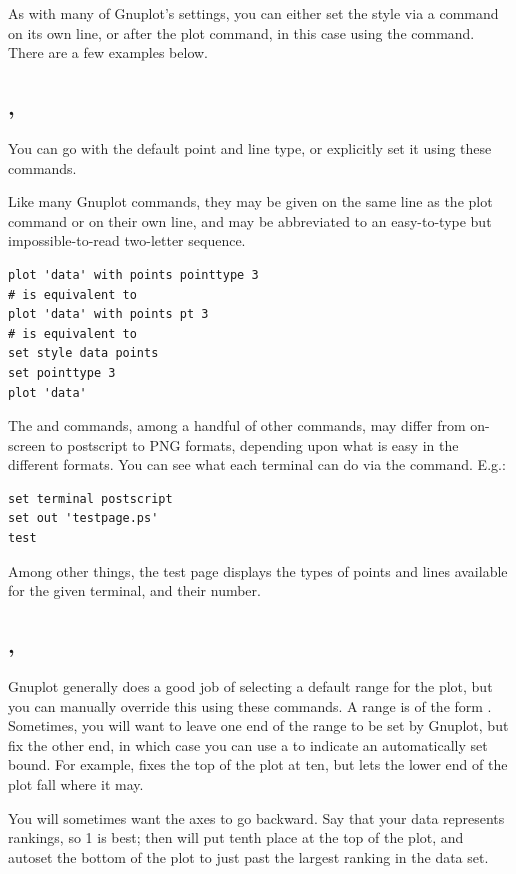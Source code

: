 As with many of Gnuplot's settings, you can either set the style via a
command on its own line, or after the plot command, in this case using the  
command. There are a few examples below.

\subsection{, } You can go with the default
point and line type, or explicitly set it using these commands.

Like many Gnuplot commands, they may be given on the same line as the
plot command or on their own line, and may be abbreviated to an
easy-to-type but impossible-to-read two-letter sequence.
\begin{lstlisting}
plot 'data' with points pointtype 3
# is equivalent to
plot 'data' with points pt 3
# is equivalent to
set style data points
set pointtype 3
plot 'data'
\end{lstlisting}

The  and  commands, among a handful of other
commands, may differ from on-screen to postscript
to PNG formats, depending upon what is easy in the different formats.  You can see what each terminal can do via the  command. E.g.:
\begin{lstlisting}
set terminal postscript
set out 'testpage.ps'
test
\end{lstlisting}
Among other things, the test page displays the types of points and lines
available for the given terminal, and their number.

\subsection{, } Gnuplot generally does a good job of
selecting a default range for the plot, but you can manually override
this using these commands. A range is of the form .
Sometimes, you will want to leave one end of the range to be set by
Gnuplot, but fix the other end, in which case you can use a \ci{*} to
indicate an automatically set bound. For example, 
fixes the top of the plot at ten, but lets the lower end of the plot
fall where it may. 

You will sometimes want the axes to go backward.  Say that your data
represents rankings, so 1 is best; then 
will put tenth place at the top of the plot, and autoset the bottom of
the plot to just past the largest ranking in the data set.

